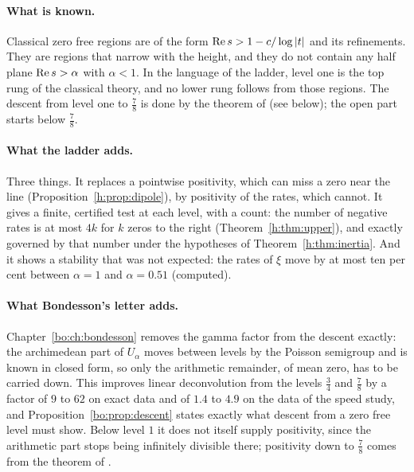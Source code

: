 \paragraph{What is known.} Classical zero free regions are of the form $\operatorname{Re} s>1-c/\log|t|$ and its refinements. They are regions that narrow with the height, and they do not contain any half plane $\operatorname{Re} s>\alpha$ with $\alpha<1$. In the language of the ladder, level one is the top rung of the classical theory, and no lower rung follows from those regions. The descent from level one to $\frac78$ is done by the theorem of \cite{OAI26a} (see below); the open part starts below $\frac78$.

\paragraph{What the ladder adds.} Three things. It replaces a pointwise positivity, which can miss a zero near the line (Proposition~\ref{h:prop:dipole}), by positivity of the rates, which cannot. It gives a finite, certified test at each level, with a count: the number of negative rates is at most $4k$ for $k$ zeros to the right (Theorem~\ref{h:thm:upper}), and exactly governed by that number under the hypotheses of Theorem~\ref{h:thm:inertia}. And it shows a stability that was not expected: the rates of $\xi$ move by at most ten per cent between $\alpha=1$ and $\alpha=0.51$ (computed).

\paragraph{What Bondesson's letter adds.} Chapter~\ref{bo:ch:bondesson} removes the gamma factor from the descent exactly: the archimedean part of $U_\alpha$ moves between levels by the Poisson semigroup and is known in closed form, so only the arithmetic remainder, of mean zero, has to be carried down. This improves linear deconvolution from the levels $\frac34$ and $\frac78$ by a factor of $9$ to $62$ on exact data and of $1.4$ to $4.9$ on the data of the speed study, and Proposition~\ref{bo:prop:descent} states exactly what descent from a zero free level must show. Below level $1$ it does not itself supply positivity, since the arithmetic part stops being infinitely divisible there; positivity down to $\frac78$ comes from the theorem of \cite{OAI26a}.

